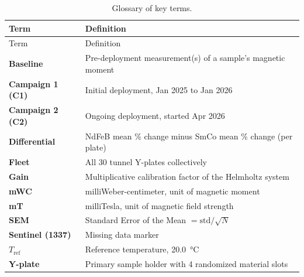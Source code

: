 \documentclass[11pt,letterpaper]{article}
\begin{document}
\begin{longtable}{@{}lp{10cm}@{}}
\caption{Glossary of key terms.} \label{tab:glossary} \\
\toprule
Term & Definition \\
\midrule
\endfirsthead
\toprule
Term & Definition \\
\midrule
\endhead
\textbf{Baseline}             & Pre-deployment measurement(s) of a sample's magnetic moment \\
\textbf{Campaign 1 (C1)}      & Initial deployment, Jan 2025 to Jan 2026 \\
\textbf{Campaign 2 (C2)}      & Ongoing deployment, started Apr 2026 \\
\textbf{Differential}          & NdFeB mean \% change minus SmCo mean \% change (per plate) \\
\textbf{Fleet}                 & All 30 tunnel Y-plates collectively \\
\textbf{Gain}                  & Multiplicative calibration factor of the Helmholtz system \\
\textbf{mWC}                   & milliWeber-centimeter, unit of magnetic moment \\
\textbf{mT}                    & milliTesla, unit of magnetic field strength \\
\textbf{SEM}                   & Standard Error of the Mean $= \mathrm{std}/\sqrt{N}$ \\
\textbf{Sentinel (1337)}       & Missing data marker \\
$T_{\mathrm{ref}}$            & Reference temperature, \SI{20.0}{\degreeCelsius} \\
\textbf{Y-plate}              & Primary sample holder with 4 randomized material slots \\
\bottomrule
\end{longtable}
\end{document}

